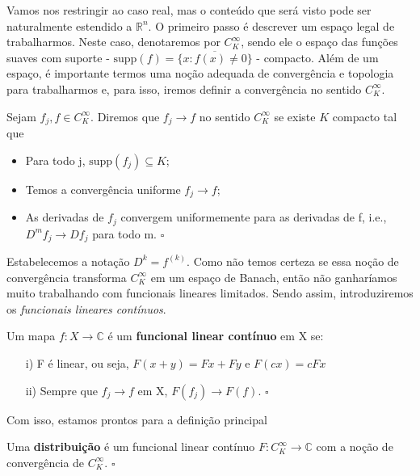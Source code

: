 \documentclass[MeasureTheory/measure_theory.tex]{subfiles}
\begin{document}
Vamos nos restringir ao caso real, mas o conteúdo que será visto pode ser naturalmente estendido a \(\mathbb{R}^{n}.\) O primeiro passo é descrever um espaço legal de trabalharmos. Neste caso,
denotaremos por \(C_{K}^{\infty}\), sendo ele o espaço das funções suaves com suporte - \(\mathrm{supp}(f) = \overline{\{x: f(x)\neq0\}}\) - compacto. Além de um espaço, é importante termos uma noção adequada de convergência e topologia
para trabalharmos e, para isso, iremos definir a convergência no sentido \(C_{K}^{\infty}.\)
\begin{def*}
	Sejam \(f_{j}, f\in C_{K}^{\infty}\). Diremos que \(f_{j}\to f\) no sentido \(C_{K}^{\infty}\) se existe \(K\) compacto tal que
	\begin{itemize}
		\item Para todo j, \(\mathrm{supp}(f_{j})\subseteq K\);
		\item Temos a convergência uniforme \(f_{j}\to f\);
		\item As derivadas de \(f_{j}\) convergem uniformemente para as derivadas de f, i.e., \(D^{m}f_{j}\to Df_{j}\) para todo m. \(\square\)
	\end{itemize}
\end{def*}
Estabelecemos a notação \(D^{k} = f^{(k)}\).
Como não temos certeza se essa noção de convergência transforma \(C_{K}^{\infty}\) em um espaço de Banach, então não ganharíamos muito trabalhando com funcionais lineares limitados. Sendo assim, introduziremos
os \textit{funcionais lineares contínuos}.
\begin{def*}
	Um mapa \(f:X\rightarrow \mathbb{C}\) é um \textbf{funcional linear contínuo} em X se:
	\begin{itemize}
		\item[i)] F é linear, ou seja, \(F(x+y) = Fx + Fy\) e \(F(cx) = cFx\)
		\item[ii)] Sempre que \(f_{j}\to f\) em X, \(F(f_{j})\to F(f)\). \(\square\)
	\end{itemize}
\end{def*}
Com isso, estamos prontos para a definição principal
\begin{def*}
	Uma \textbf{distribuição} é um funcional linear contínuo \(F:C_{K}^{\infty}\rightarrow \mathbb{C}\) com a noção de convergência de \(C_{K}^{\infty}.\) \(\square\)
\end{def*}
\end{document}
